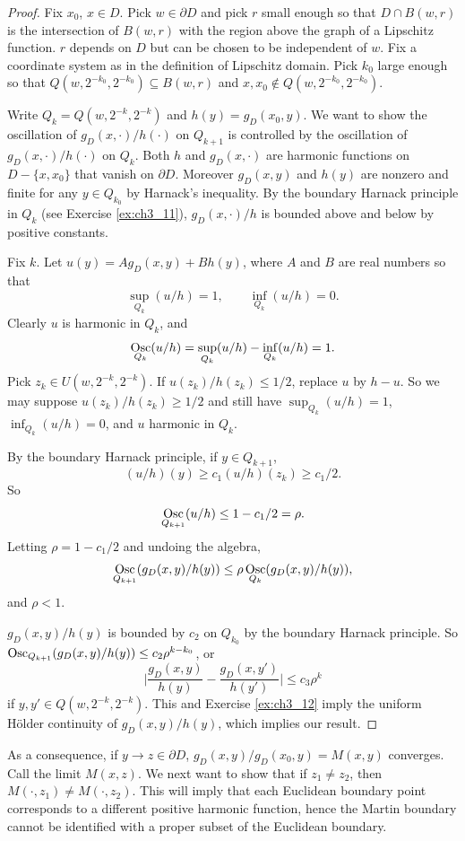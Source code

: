 \begin{proof}
Fix $x_0$, $x \in D$. Pick $w \in \partial D$ and pick $r$ small enough so that $D \cap B(w,r)$ is the intersection of $B(w,r)$ with the region above the graph of a Lipschitz function. $r$ depends on $D$ but can be chosen to be independent of $w$. Fix a coordinate system as in the definition of Lipschitz domain. Pick $k_0$ large enough so that $Q(w,2^{-k_0},2^{-k_0}) \subseteq B(w,r)$ and $x,x_0 \not\in Q(w,2^{-k_0},2^{-k_0})$.

Write $Q_k = Q(w,2^{-k},2^{-k})$ and $h(y) = g_D(x_0,y)$. We want to show the oscillation of $g_D(x,\cdot)/h(\cdot)$ on $Q_{k+1}$ is controlled by the oscillation of $g_D(x,\cdot)/h(\cdot)$ on $Q_k$. Both $h$ and $g_D(x,\cdot)$ are harmonic functions on $D - \{x,x_0\}$ that vanish on $\partial D$. Moreover $g_D(x,y)$ and $h(y)$ are nonzero and finite for any $y \in Q_{k_0}$ by Harnack's inequality. By the boundary Harnack principle in $Q_k$ (see Exercise \ref{ex:ch3_11}), $g_D(x,\cdot)/h$ is bounded above and below by positive constants.

Fix $k$. Let $u(y) = Ag_D(x,y) + Bh(y)$, where $A$ and $B$ are real numbers so that
\mpagebreak
\[
    \sup_{Q_k}(u/h) = 1, \qquad \inf_{Q_k}(u/h) = 0.
\]
Clearly $u$ is harmonic in $Q_k$, and
\[
    \operatorname*{Osc}_{Q_k}(u/h) = \sup_{Q_k}(u/h) - \inf_{Q_k}(u/h) = 1.
\]
Pick $z_k \in U(w,2^{-k},2^{-k})$. If $u(z_k)/h(z_k) \leq 1/2$, replace $u$ by $h-u$. So we may suppose $u(z_k)/h(z_k) \geq 1/2$ and still have $\sup_{Q_k}(u/h) = 1$, $\inf_{Q_k}(u/h) = 0$, and $u$ harmonic in $Q_k$.

By the boundary Harnack principle, if $y \in Q_{k+1}$,
\[
    (u/h)(y) \geq c_1(u/h)(z_k) \geq c_1/2.
\]
So
\[
    \operatorname*{Osc}_{Q_{k+1}}(u/h) \leq 1-c_1/2 = \rho.
\]
Letting $\rho = 1-c_1/2$ and undoing the algebra,
\[
    \operatorname*{Osc}_{Q_{k+1}}(g_D(x,y)/h(y)) \leq \rho \operatorname*{Osc}_{Q_k}(g_D(x,y)/h(y)),
\]
and $\rho < 1$.

$g_D(x,y)/h(y)$ is bounded by $c_2$ on $Q_{k_0}$ by the boundary Harnack principle. So $\operatorname*{Osc}_{Q_{k+1}}(g_D(x,y)/h(y)) \leq c_2\rho^{k-k_0}$, or
\[
    \Big|\frac{g_D(x,y)}{h(y)} - \frac{g_D(x,y')}{h(y')}\Big| \leq c_3\rho^k
\]
if $y,y' \in Q(w,2^{-k},2^{-k})$. This and Exercise \ref{ex:ch3_12} imply the uniform H\"older continuity of $g_D(x,y)/h(y)$, which implies our result.
\end{proof}

As a consequence, if $y \to z \in \partial D$, $g_D(x,y)/g_D(x_0,y) = M(x,y)$ converges. Call the limit $M(x,z)$. We next want to show that if $z_1 \neq z_2$, then $M(\cdot,z_1) \neq M(\cdot,z_2)$. This will imply that each Euclidean boundary point corresponds to a different positive harmonic function, hence the Martin boundary cannot be identified with a proper subset of the Euclidean boundary.

